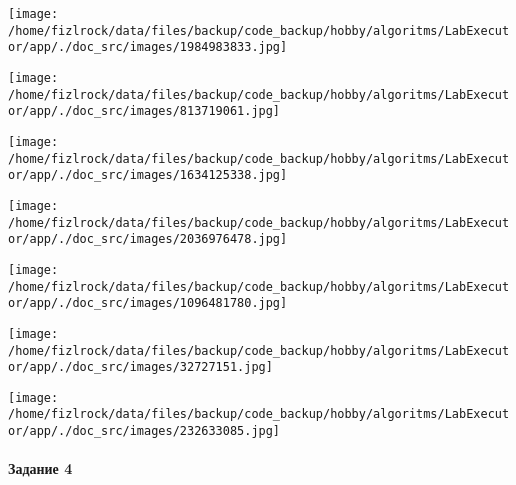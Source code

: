 \documentclass[a4paper, 12pt]{article}
\begin{document}
\texttt{[image: /home/fizlrock/data/files/backup/code\_backup/hobby/algoritms/LabExecutor/app/./doc\_src/images/1984983833.jpg]}

\texttt{[image: /home/fizlrock/data/files/backup/code\_backup/hobby/algoritms/LabExecutor/app/./doc\_src/images/813719061.jpg]}

\texttt{[image: /home/fizlrock/data/files/backup/code\_backup/hobby/algoritms/LabExecutor/app/./doc\_src/images/1634125338.jpg]}

\texttt{[image: /home/fizlrock/data/files/backup/code\_backup/hobby/algoritms/LabExecutor/app/./doc\_src/images/2036976478.jpg]}

\texttt{[image: /home/fizlrock/data/files/backup/code\_backup/hobby/algoritms/LabExecutor/app/./doc\_src/images/1096481780.jpg]}

\texttt{[image: /home/fizlrock/data/files/backup/code\_backup/hobby/algoritms/LabExecutor/app/./doc\_src/images/32727151.jpg]}

\texttt{[image: /home/fizlrock/data/files/backup/code\_backup/hobby/algoritms/LabExecutor/app/./doc\_src/images/232633085.jpg]}
\pagebreak
\paragraph{Задание 4}
\end{document}
